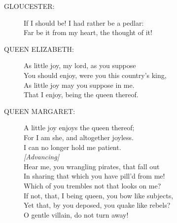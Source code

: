 \documentclass{article}
\begin{document}
\begin{description}
\item[GLOUCESTER:] 
\hspace{1pt}If I should be! I had rather be a pedlar:\\
\hspace{1pt}Far be it from my heart, the thought of it!\\
\end{description}
\begin{description}
\item[QUEEN ELIZABETH:] 
\hspace{1pt}As little joy, my lord, as you suppose\\
\hspace{1pt}You should enjoy, were you this country's king,\\
\hspace{1pt}As little joy may you suppose in me.\\
\hspace{1pt}That I enjoy, being the queen thereof.\\
\end{description}
\begin{description}
\item[QUEEN MARGARET:] 
\hspace{1pt}A little joy enjoys the queen thereof;\\
\hspace{1pt}For I am she, and altogether joyless.\\
\hspace{1pt}I can no longer hold me patient.\\
{\it [Advancing]}\\
\hspace{1pt}Hear me, you wrangling pirates, that fall out\\
\hspace{1pt}In sharing that which you have pill'd from me!\\
\hspace{1pt}Which of you trembles not that looks on me?\\
\hspace{1pt}If not, that, I being queen, you bow like subjects,\\
\hspace{1pt}Yet that, by you deposed, you quake like rebels?\\
\hspace{1pt}O gentle villain, do not turn away!\\
\end{description}
\end{document}
